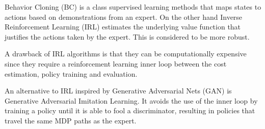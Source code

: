 Behavior Cloning (BC) is a class supervised learning methods that maps states to actions based on demonstrations from an expert. On the other hand Inverse Reinforcement Learning (IRL) estimates the underlying value function that justifies the actions taken by the expert. This is considered to be more robust.

A drawback of IRL algorithms is that they can be computationally expensive since they require a reinforcement learning inner loop between the cost estimation, policy training and evaluation. 

An alternative to IRL inspired by Generative Adversarial Nets (GAN) is Generative
Adversarial Imitation Learning. It avoids the use of the inner loop by training a policy until it is able to fool a discriminator, resulting in policies that travel the same MDP paths as the expert.
